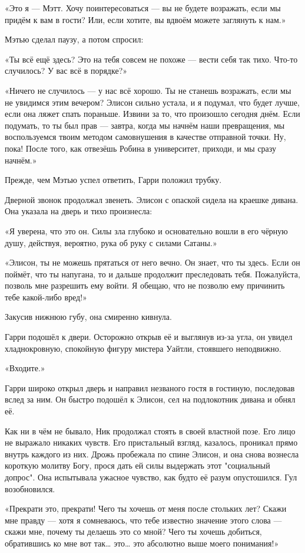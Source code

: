 \documentclass[a5paper, 9pt,
final, openany, twoside=true]{memoir}
\begin{document}
«Это я — Мэтт. Хочу поинтересоваться — вы не будете возражать, если мы придём к вам в гости? Или, если хотите, вы вдвоём можете заглянуть к нам.»

Мэтью сделал паузу, а потом спросил:

«Ты всё ещё здесь? Это на тебя совсем не похоже — вести себя так тихо. Что-то случилось? У вас всё в порядке?»

«Ничего не случилось — у нас всё хорошо. Ты не станешь возражать, если мы не увидимся этим вечером? Элисон сильно устала, и я подумал, что будет лучше, если она ляжет спать пораньше. Извини за то, что произошло сегодня днём. Если подумать, то ты был прав — завтра, когда мы начнём наши превращения, мы воспользуемся твоим методом самовнушения в качестве отправной точки. Ну, пока! После того, как отвезёшь Робина в университет, приходи, и мы сразу начнём.»

Прежде, чем Мэтью успел ответить, Гарри положил трубку.

Дверной звонок продолжал звенеть. Элисон с опаской сидела на краешке дивана. Она указала на дверь и тихо произнесла:

«Я уверена, что это он. Силы зла глубоко и основательно вошли в его чёрную душу, действуя, вероятно, рука об руку с силами Сатаны.»

«Элисон, ты не можешь прятаться от него вечно. Он знает, что ты здесь. Если он поймёт, что ты напугана, то и дальше продолжит преследовать тебя. Пожалуйста, позволь мне разрешить ему войти. Я обещаю, что не позволю ему причинить тебе какой-либо вред!»

Закусив нижнюю губу, она смиренно кивнула.

Гарри подошёл к двери. Осторожно открыв её и выглянув из-за угла, он увидел хладнокровную, спокойную фигуру мистера Уайтли, стоявшего неподвижно.\bigskip

«Входите.»

Гарри широко открыл дверь и направил незваного гостя в гостиную, последовав вслед за ним. Он быстро подошёл к Элисон, сел на подлокотник дивана и обнял её.

Как ни в чём не бывало, Ник продолжал стоять в своей властной позе. Его лицо не выражало никаких чувств. Его пристальный взгляд, казалось, проникал прямо внутрь каждого из них. Дрожь пробежала по спине Элисон, и она снова вознесла короткую молитву Богу, прося дать ей силы выдержать этот "социальный допрос". Она испытывала ужасное чувство, как будто её разум опустошился. Гул возобновился.

«Прекрати это, прекрати! Чего ты хочешь от меня после стольких лет? Скажи мне правду — хотя я сомневаюсь, что тебе известно значение этого слова — скажи мне, почему ты делаешь это со мной? Чего ты хочешь добиться, обратившись ко мне вот так… это… это абсолютно выше моего понимания!»
\end{document}
